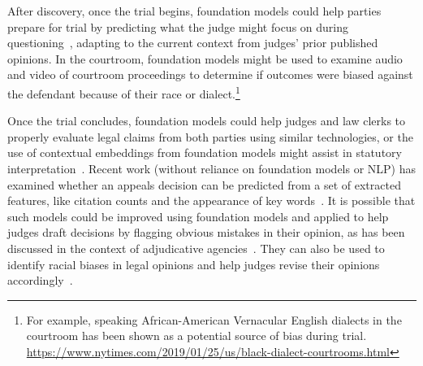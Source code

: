 After discovery, once the trial begins, foundation models could help parties prepare for trial by predicting what the judge might focus on during questioning~\citep{dickinson2018computational}, adapting to the current context from judges' prior published opinions. In the courtroom, foundation models might be used to examine audio and video of courtroom proceedings to determine if outcomes were biased against the defendant because of their race or dialect.\footnote{For example, speaking African-American Vernacular English dialects in the courtroom has been shown as a potential source of bias during trial. \url{https://www.nytimes.com/2019/01/25/us/black-dialect-courtrooms.html}}

Once the trial concludes, foundation models could help judges and law clerks to properly evaluate legal claims from both parties using similar technologies, or the use of contextual embeddings from foundation models might assist in statutory interpretation~\citep{nyarko2020statistical,choi2020empirical}. Recent work (without reliance on foundation models or NLP) has examined whether an appeals decision can be predicted from a set of extracted features, like citation counts and the appearance of key words~\citep{katz2017general,boniol2020performance}. It is possible that such models could be improved using foundation models and applied to help judges draft decisions by flagging obvious mistakes in their opinion, as has been discussed in the context of adjudicative agencies~\citep{engstrom2020government,ray2014government}. They can also be used to identify racial biases in legal opinions and help judges revise their opinions accordingly~\citep{rice2019racial}.

